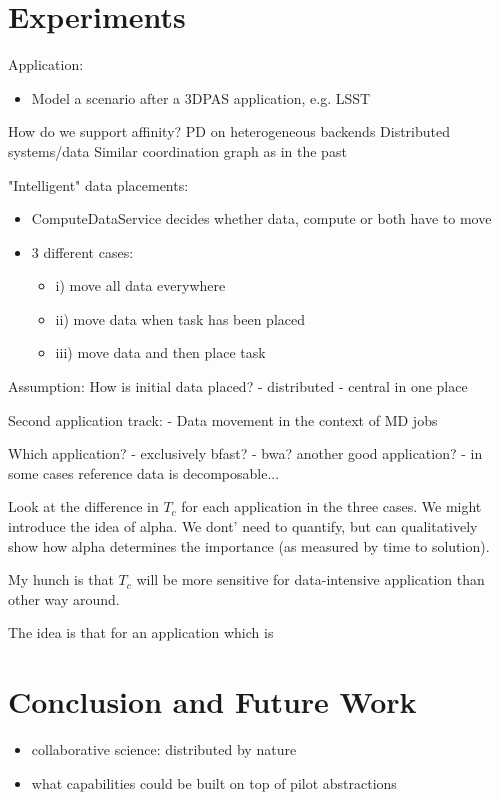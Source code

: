 \documentclass[conference]{IEEEtran}
\begin{document}
\section{Experiments}

Application:
\begin{itemize}
	\item Model a scenario after a 3DPAS application, e.g. LSST
\end{itemize}


How do we support affinity?
PD on heterogeneous backends
Distributed systems/data
Similar coordination graph as in the past


"Intelligent" data placements:
\begin{itemize}

	\item ComputeDataService decides whether data, compute or both have to move
	\item 3 different cases:
\begin{itemize}
	\item 	i) move all data everywhere
	\item 	ii) move data when task has been placed
	\item     iii) move data and then place task
\end{itemize}
\end{itemize}


Assumption:
How is initial data placed?
- distributed
- central in one place

Second application track:
- Data movement in the context of MD jobs

Which application?
- exclusively bfast?
- bwa? another good application?
- in some cases reference data is decomposable...

Look at the difference in $T_c$ for each application in the three
cases. We might introduce the idea of alpha. We dont' need to
quantify, but can qualitatively show how alpha determines the
importance (as measured by time to solution). 

My hunch is that $T_c$ will be more sensitive for data-intensive
application than other way around.

The idea is that for an application which is



\section{Conclusion and Future Work}

\begin{itemize}
\item collaborative science: distributed by nature
\item what capabilities could be built on top of pilot abstractions
\end{itemize}
\end{document}
